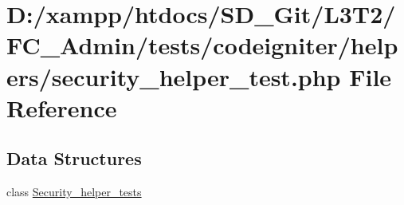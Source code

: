 \hypertarget{_admin_2tests_2codeigniter_2helpers_2security__helper__test_8php}{}\section{D\+:/xampp/htdocs/\+S\+D\+\_\+\+Git/\+L3\+T2/\+F\+C\+\_\+\+Admin/tests/codeigniter/helpers/security\+\_\+helper\+\_\+test.php File Reference}
\label{_admin_2tests_2codeigniter_2helpers_2security__helper__test_8php}
\subsection*{Data Structures}
\begin{DoxyCompactItemize}
\item 
class \hyperlink{class_security__helper__tests}{Security\+\_\+helper\+\_\+tests}
\end{DoxyCompactItemize}
